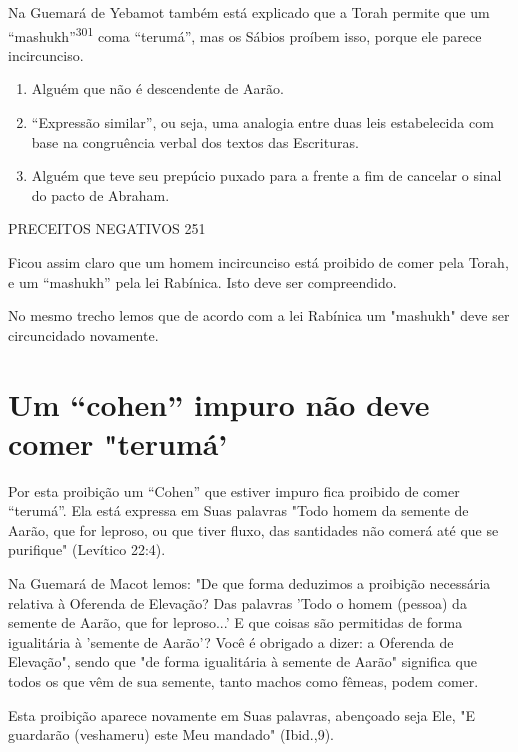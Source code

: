 Na Guemará de Yebamot também está explicado que a Torah per­mite que um
``mashukh''\textsuperscript{301} coma ``terumá'', mas os Sábios proíbem
isso, por­que ele parece incircunciso.


\begin{enumerate}
\def\labelenumi{\arabic{enumi}.}
\setcounter{enumi}{298}
\item
 
 Alguém que não é descendente de Aarão.
 
\item
 
 ``Expressão similar'', ou seja, uma analogia entre duas leis
 estabelecida com base na congruência verbal dos textos das Escrituras.
 
\item
 
 Alguém que teve seu prepúcio puxado para a frente a fim de cancelar o
 sinal do pacto de Abraham.
 
\end{enumerate}


PRECEITOS NEGATIVOS 251

Ficou assim claro que um homem incircunciso está proibido de co­mer pela
Torah, e um ``mashukh'' pela lei Rabínica. Isto deve ser compreendido.

No mesmo trecho lemos que de acordo com a lei Rabínica um "mas­hukh"
deve ser circuncidado novamente.

\section{Um ``cohen'' impuro não deve comer "terumá'}

Por esta proibição um ``Cohen'' que estiver impuro fica proibido de comer
``terumá''. Ela está expressa em Suas palavras "Todo homem da semen­te de
Aarão, que for leproso, ou que tiver fluxo, das santidades não comerá
até que se purifique" (Levítico 22:4).

Na Guemará de Macot lemos: "De que forma deduzimos a proibição
necessária relativa à Oferenda de Elevação? Das palavras 'Todo o homem
(pes­soa) da semente de Aarão, que for leproso...' E que coisas são
permitidas de forma igualitária à 'semente de Aarão'? Você é obrigado a
dizer: a Oferenda de Elevação", sendo que "de forma igualitária à
semente de Aarão" significa que todos os que vêm de sua semente, tanto
machos como fêmeas, podem comer.

Esta proibição aparece novamente em Suas palavras, abençoado se­ja Ele,
"E guardarão (veshameru) este Meu mandado" (Ibid.,9).

